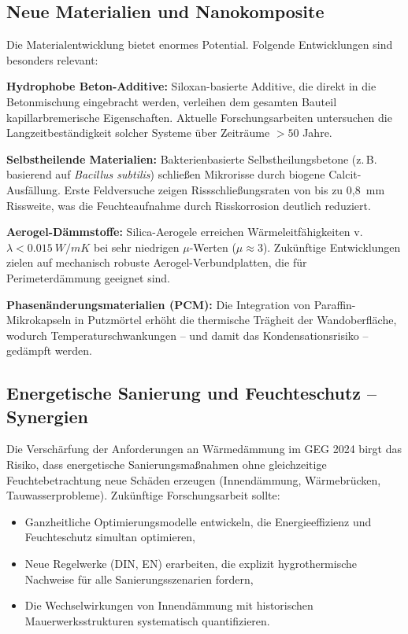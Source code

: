 ﻿\documentclass[a4paper,12pt]{article}
\theoremstyle{definition}
\begin{document}
\subsection{Neue Materialien und Nanokomposite}

Die Materialentwicklung bietet enormes Potential. Folgende Entwicklungen
sind besonders relevant:

\textbf{Hydrophobe Beton-Additive:} Siloxan-basierte Additive, die
direkt in die Betonmischung eingebracht werden, verleihen dem gesamten
Bauteil kapillarbremerische Eigenschaften. Aktuelle Forschungsarbeiten
untersuchen die Langzeitbest\"andigkeit solcher Systeme \"uber
Zeitr\"aume $> 50$ Jahre.

\textbf{Selbstheilende Materialien:} Bakterienbasierte Selbstheilungsbetone
(z.\,B. basierend auf \textit{Bacillus subtilis}) schlie\ss{}en Mikrorisse
durch biogene Calcit-Ausf\"allung. Erste Feldversuche zeigen
Rissschlie\ss{}ungsraten von bis zu 0{,}8~mm Rissweite, was die
Feuchteaufnahme durch Risskorrosion deutlich reduziert.

\textbf{Aerogel-D\"ammstoffe:} Silica-Aerogele erreichen
W\"armeleitf\"ahigkeiten v. $\lambda < \SI{0.015}{W/mK}$ bei sehr
niedrigen $\mu$-Werten ($\mu \approx 3$). Zuk\"unftige Entwicklungen
zielen auf mechanisch robuste Aerogel-Verbundplatten, die f\"ur
Perimeterd\"ammung geeignet sind.

\textbf{Phasen\"anderungsmaterialien (PCM):} Die Integration von
Paraffin-Mikrokapseln in Putzm\"ortel erh\"oht die thermische Tr\"agheit
der Wandoberfl\"ache, wodurch Temperaturschwankungen -- und damit
das Kondensationsrisiko -- ged\"ampft werden.

\subsection{Energetische Sanierung und Feuchteschutz -- Synergien}

Die Versch\"arfung der Anforderungen an W\"armed\"ammung im GEG 2024
birgt das Risiko, dass energetische Sanierungsma\ss{}nahmen ohne
gleichzeitige Feuchtebetrachtung neue Sch\"aden erzeugen
(Innend\"ammung, W\"armebr\"ucken, Tauwasserprobleme). Zuk\"unftige
Forschungsarbeit sollte:
\begin{itemize}
  \item Ganzheitliche Optimierungsmodelle entwickeln, die Energieeffizienz
        und Feuchteschutz simultan optimieren,
  \item Neue Regelwerke (DIN, EN) erarbeiten, die explizit
        hygrothermische Nachweise f\"ur alle Sanierungsszenarien fordern,
  \item Die Wechselwirkungen von Innend\"ammung mit historischen
        Mauerwerksstrukturen systematisch quantifizieren.
\end{itemize}
\end{document}
